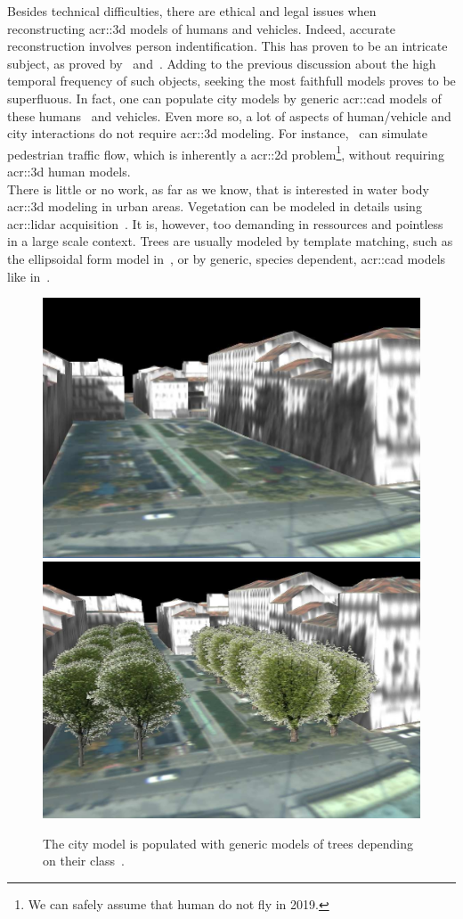             Besides technical difficulties, there are ethical and legal issues when reconstructing \gls{acr::3d} models of humans and vehicles.
            Indeed, accurate reconstruction involves person indentification.
            This has proven to be an intricate subject, as proved by~\textcite{tavani2011ethics} and~\textcite{thornton2010individual}.
            Adding to the previous discussion about the high temporal frequency of such objects, seeking the most faithfull models proves to be superfluous.
            In fact, one can populate city models by generic \gls{acr::cad} models of these humans~\parencite{shao2007autonomous} and vehicles.
            Even more so, a lot of aspects of human/vehicle and city interactions do not require \gls{acr::3d} modeling.
            For instance,~\textcite{lovaas1994modeling} can simulate pedestrian traffic flow, which is inherently a \gls{acr::2d} problem\footnote{
                We can safely assume that human do not fly in 2019.
            }, without requiring \gls{acr::3d} human models.\\
            There is little or no work, as far as we know, that is interested in water body \gls{acr::3d} modeling in urban areas.
            Vegetation can be modeled in details using \gls{acr::lidar} acquisition~\parencite{omasa20063d}.
            It is, however, too demanding in ressources and pointless in a large scale context.
            Trees are usually modeled by template matching, such as the ellipsoidal form model in~\textcite{lafarge_ijcv12}, or by generic, species dependent, \gls{acr::cad} models like in~\textcite{iovan2008detection}.\\
            \begin{figure}[htpb]
                \centering
                \includegraphics[width=.48\textwidth]{images/introduction/modeling_trees_1}
                \includegraphics[width=.48\textwidth]{images/introduction/modeling_trees_2}
                \caption{
                    \label{fig::3d_tree_models} The city model is populated with generic models of trees depending on their class~\parencite{iovan2008detection}.
                }
            \end{figure}

